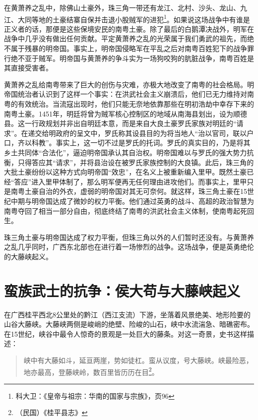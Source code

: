 在黄萧养之乱中，除佛山土豪外，珠三角一带还有龙江、北村、沙头、龙山、九江、大同等地的土豪结寨自保并击退小股贼军的进犯\footnote{科大卫：《皇帝与祖宗：华南的国家与宗族》，页96}。如果说这场战争中有谁是正义者的话，那便是这些保境安民的南粤土豪。除了最后的白鹅潭决战外，明军在战争中几乎没有做出任何贡献。平定黄萧养之乱的光荣属于我们勇武的祖先，而绝不属于残暴的明帝国。事实上，明帝国侵略军在平乱之后对南粤百姓犯下的战争罪行绝不亚于贼军。明帝国与黄萧养的争斗实为一场狗咬狗的肮脏战争，南粤百姓是其直接受害者。

黄萧养之乱给南粤带来了巨大的创伤与灾难，亦极大地改变了南粤的社会格局。明帝国统治者认识到了这样一个事实：在洪武社会主义崩溃后，他们已无力维持对南粤的有效统治。当流寇出现时，他们只能无奈地依靠那些在明初浩劫中幸存下来的南粤土豪。1451年，明廷将曾为贼军核心控制区的地域从南海县划出，设为顺德县。这一行政规划并非出自明廷本意，而是来自大良土豪罗氏家族对明廷的“请求”。在递交给明政府的呈文中，罗氏称其设县目的为将当地人“治以官司，联以户口，齐以科教”。事实上，这一切不过是罗氏的托词。罗氏的真实目的，乃是将其乡土共同体“合法化”，逼迫明帝国承认其自治权。明帝国难以与罗氏的强大势力抗衡，只得答应其“请求”，并将县治设在被罗氏家族控制的大良镇。此后，珠三角的大批土豪纷纷以这种方式向明帝国“效忠”，在名义上被重新编入里甲。既然土豪已经“答应”进入里甲体制了，那么明军便再无任何理由进攻他们。而事实上，里甲只是南粤土豪自治的外衣，虚弱的明帝国对其无可奈何。就这样，珠三角土豪在15世纪中期与明帝国达成了微妙的权力平衡。他们通过英勇的战斗、高超的政治智慧为南粤夺回了相当一部分自由，彻底终结了南粤的洪武社会主义体制，使南粤起死回生。

珠三角土豪与明帝国达成了权力平衡，但珠三角以外的人们暂时还没有。与黄萧养之乱几乎同时，广西东北部也在进行着一场惨烈的战争。这场战争，便是英勇绝伦的大藤峡起义。

\section{蛮族武士的抗争：侯大苟与大藤峡起义}

\indent 在广西桂平西北8公里处的黔江（西江支流）下游，坐落着风景绝美、地形险要的山谷大藤峡。大藤峡两侧是峻峭的绝壁、险峻的山石，峡中水流湍急、暗礁密布。在15世纪，峡谷中最令人惊奇的景观是一处巨大的藤条。对这一奇景，史书这样描述：

\begin{quote}
	
峡中有大藤如斗，延亘两崖，势如徒杠。蛮从议度，号大藤峡。峡最险恶，地亦最高，登藤峡岭，数百里皆历历在目\footnote{（民国）《桂平县志》}。
\end{quote}

